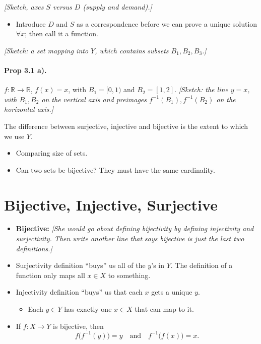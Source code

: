 \documentclass[11pt]{article}
\newcommand{\note}[1]{\textcolor{red!60!black}{\textit{[#1]}}}
\newcommand{\R}{\mathbb{R}}
\begin{document}
\note{Sketch, axes $S$ versus $D$ (supply and demand).}
\begin{itemize}
  \item Introduce $D$ and $S$ as a correspondence before we can prove a unique solution $\forall x$; then call it a function.
\end{itemize}

\note{Sketch: a set mapping into $Y$, which contains subsets $B_1, B_2, B_3$.}

\paragraph{Prop 3.1 a).} $f : \R \to \R$, $f(x) = x$, with $B_1 = [0,1)$ and $B_2 = [1,2]$.
\note{Sketch: the line $y = x$, with $B_1, B_2$ on the vertical axis and preimages $f^{-1}(B_1), f^{-1}(B_2)$ on the horizontal axis.}

\medskip
The difference between surjective, injective and bijective is the extent to which we use $Y$.

\begin{itemize}
  \item[?] Comparing size of sets.
  \item[?] Can two sets be bijective? They must have the same cardinality.
\end{itemize}

\section{Bijective, Injective, Surjective}

\begin{itemize}
  \item \textbf{Bijective:} \note{She would go about defining bijectivity by defining injectivity and surjectivity. Then write another line that says bijective is just the last two definitions.}
  \item Surjectivity definition ``buys'' us all of the $y$'s in $Y$. The definition of a function only maps all $x \in X$ to something.
  \item Injectivity definition ``buys'' us that each $x$ gets a unique $y$.
  \begin{itemize}
    \item Each $y \in Y$ has exactly one $x \in X$ that can map to it.
  \end{itemize}
  \item If $f : X \to Y$ is bijective, then
  \[
    f\bigl(f^{-1}(y)\bigr) = y \quad\text{and}\quad f^{-1}\bigl(f(x)\bigr) = x.
  \]
\end{itemize}
\end{document}

